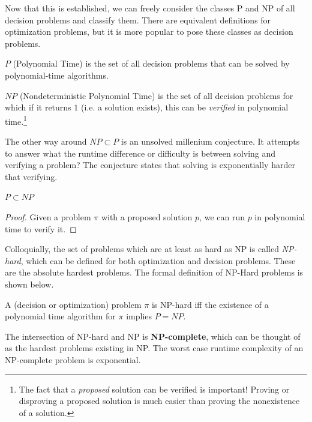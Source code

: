 \documentclass{article}
\begin{document}
    Now that this is established, we can freely consider the classes P and NP of all decision problems and classify them. There are equivalent definitions for optimization problems, but it is more popular to pose these classes as decision problems. 

    \begin{definition}[P]
      $P$ (Polynomial Time) is the set of all decision problems that can be solved by polynomial-time algorithms. 
    \end{definition} 

    \begin{definition}[NP]
      $NP$ (Nondeterministic Polynomial Time) is the set of all decision problems for which if it returns $1$ (i.e. a solution exists), this can be \textit{verified} in polynomial time.\footnote{The fact that a \textit{proposed} solution can be verified is important! Proving or disproving a proposed solution is much easier than proving the nonexistence of a solution.}
    \end{definition}

    The other way around $NP \subset P$ is an unsolved millenium conjecture. It attempts to answer what the runtime difference or difficulty is between solving and verifying a problem? The conjecture states that solving is exponentially harder that verifying. 

    \begin{theorem}
      $P \subset NP$
    \end{theorem}
    \begin{proof}
      Given a problem $\pi$ with a proposed solution $p$, we can run $p$ in polynomial time to verify it. 
    \end{proof}

    Colloquially, the set of problems which are at least as hard as NP is called \textit{NP-hard}, which can be defined for both optimization and decision problems. These are the absolute hardest problems. The formal definition of NP-Hard problems is shown below. 

    \begin{definition}[NP-Hard]
      A (decision or optimization) problem $\pi$ is NP-hard iff the existence of a polynomial time algorithm for $\pi$ implies $P = NP$. 
    \end{definition}

    \begin{definition}[NP-Complete]
      The intersection of NP-hard and NP is \textbf{NP-complete}, which can be thought of as the hardest problems existing in NP. The worst case runtime complexity of an NP-complete problem is exponential. 
    \end{definition}
\end{document}
